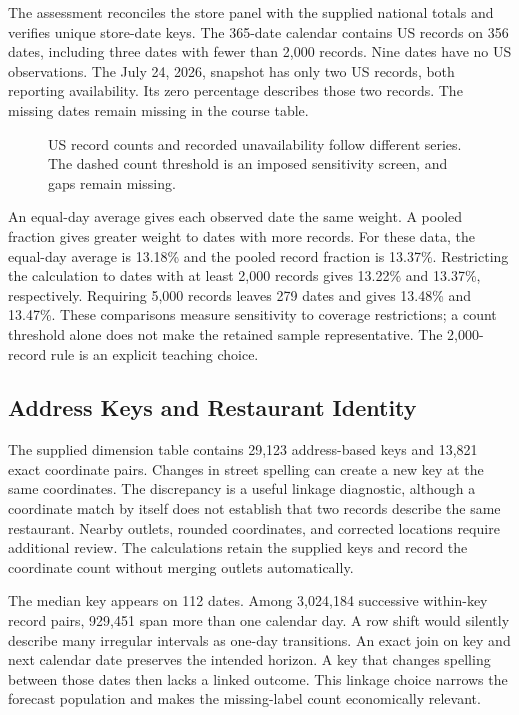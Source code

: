 The assessment reconciles the store panel with the supplied national
totals and verifies unique store-date keys. The 365-date calendar
contains US records on 356 dates, including three dates with fewer than
2,000 records. Nine dates have no US observations. The July 24, 2026,
snapshot has only two US records, both reporting availability. Its zero
percentage describes those two records. The missing dates remain missing
in the course table.

\begin{figure}[htbp]
\centering

\caption{US record counts and recorded unavailability follow different series. The dashed count threshold is an imposed sensitivity screen, and gaps remain missing.}\label{fig:M02_mcbroken_coverage}
\end{figure}

An equal-day average gives each observed date the same weight. A pooled
fraction gives greater weight to dates with more records. For these
data, the equal-day average is 13.18\% and the pooled record fraction is
13.37\%. Restricting the calculation to dates with at least 2,000
records gives 13.22\% and 13.37\%, respectively. Requiring 5,000 records
leaves 279 dates and gives 13.48\% and 13.47\%. These comparisons
measure sensitivity to coverage restrictions; a count threshold alone
does not make the retained sample representative. The 2,000-record rule
is an explicit teaching choice.

\FloatBarrier

\hypertarget{M02-address-keys-and-restaurant-identity}{%
\subsection{Address Keys and Restaurant
Identity}\label{M02-address-keys-and-restaurant-identity}}

\noindent \noindent The supplied dimension table contains 29,123 address-based
keys and 13,821 exact coordinate pairs. Changes in street spelling can
create a new key at the same coordinates. The discrepancy is a useful
linkage diagnostic, although a coordinate match by itself does not
establish that two records describe the same restaurant. Nearby outlets,
rounded coordinates, and corrected locations require additional review.
The calculations retain the supplied keys and record the coordinate
count without merging outlets automatically.

The median key appears on 112 dates. Among 3,024,184 successive
within-key record pairs, 929,451 span more than one calendar day. A row
shift would silently describe many irregular intervals as one-day
transitions. An exact join on key and next calendar date preserves the
intended horizon. A key that changes spelling between those dates then
lacks a linked outcome. This linkage choice narrows the forecast
population and makes the missing-label count economically relevant.

